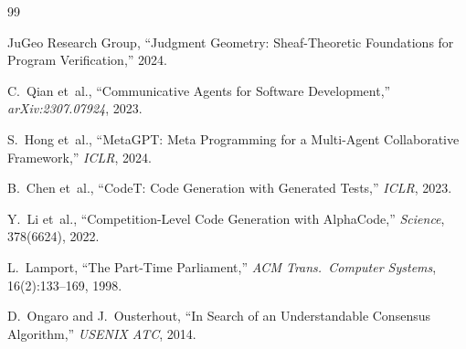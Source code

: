 \documentclass[11pt]{article}
\begin{document}
\begin{thebibliography}{99}

JuGeo Research Group, ``Judgment Geometry: Sheaf-Theoretic Foundations
for Program Verification,'' 2024.

C.~Qian et~al., ``Communicative Agents for Software Development,''
\emph{arXiv:2307.07924}, 2023.

S.~Hong et~al., ``MetaGPT: Meta Programming for a Multi-Agent
Collaborative Framework,'' \emph{ICLR}, 2024.

B.~Chen et~al., ``CodeT: Code Generation with Generated Tests,''
\emph{ICLR}, 2023.

Y.~Li et~al., ``Competition-Level Code Generation with AlphaCode,''
\emph{Science}, 378(6624), 2022.

L.~Lamport, ``The Part-Time Parliament,''
\emph{ACM Trans.\ Computer Systems}, 16(2):133--169, 1998.

D.~Ongaro and J.~Ousterhout, ``In Search of an Understandable
Consensus Algorithm,'' \emph{USENIX ATC}, 2014.

\end{thebibliography}
\end{document}
